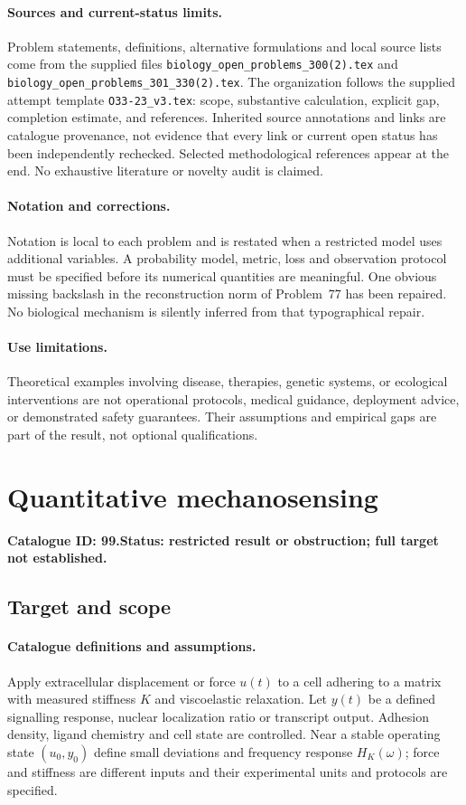 \documentclass[11pt]{article}
\begin{document}
\paragraph{Sources and current-status limits.}
Problem statements, definitions, alternative formulations and local source lists
come from the supplied files
\texttt{biology\_open\_problems\_300(2).tex} and
\texttt{biology\_open\_problems\_301\_330(2).tex}.
The organization follows the supplied attempt template
\texttt{O33-23\_v3.tex}: scope, substantive calculation, explicit gap,
completion estimate, and references. Inherited source annotations and links are
catalogue provenance, not evidence that every link or current open status has
been independently rechecked. Selected methodological references appear at the
end. No exhaustive literature or novelty audit is claimed.

\paragraph{Notation and corrections.}
Notation is local to each problem and is restated when a restricted model uses
additional variables. A probability model, metric, loss and observation protocol
must be specified before its numerical quantities are meaningful. One obvious
missing backslash in the reconstruction norm of Problem~77 has been repaired.
No biological mechanism is silently inferred from that typographical repair.

\paragraph{Use limitations.}
Theoretical examples involving disease, therapies, genetic systems, or ecological
interventions are not operational protocols, medical guidance, deployment advice,
or demonstrated safety guarantees. Their assumptions and empirical gaps are part
of the result, not optional qualifications.

\setcounter{section}{98}
\section{Quantitative mechanosensing}
\label{prob:099}
\noindent\textbf{Catalogue ID: 99.}\quad \textbf{Status: restricted result or obstruction; full target not established.}
\subsection{Target and scope}
\paragraph{Catalogue definitions and assumptions.}
Apply extracellular displacement or force $u(t)$ to a cell adhering to a matrix with measured stiffness $K$ and viscoelastic relaxation. Let $y(t)$ be a defined signalling response, nuclear localization ratio or transcript output. Adhesion density, ligand chemistry and cell state are controlled. Near a stable operating state $(u_0,y_0)$ define small deviations and frequency response $H_K(\omega)$; force and stiffness are different inputs and their experimental units and protocols are specified.
\end{document}
